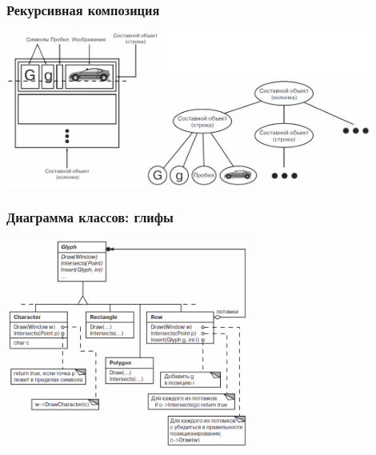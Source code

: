 \documentclass{../../slides-style}
\begin{document}
    \begin{frame}
        \frametitle{Рекурсивная композиция}
        \begin{center}
            \includegraphics[width=0.9\textwidth]{recursiveComposition.png}
        \end{center}
    \end{frame}

    \begin{frame}
        \frametitle{Диаграмма классов: глифы}
        \begin{center}
            \includegraphics[width=0.6\textwidth]{glyphs.png}
        \end{center}
    \end{frame}
\end{document}
